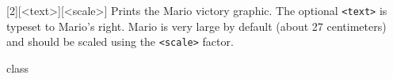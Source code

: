 \begin{macro}{\mariovictory}[2]{[<text>]}{[<scale>]}
Prints the Mario victory graphic. The optional \texttt{<text>} is typeset to Mario's right. Mario is very large by default (about 27 centimeters) and should be scaled using the \texttt{<scale>} factor.
\begin{MacroCode}{class}
\DeclareDocumentCommand {} {
}

\end{MacroCode}
\end{macro}


